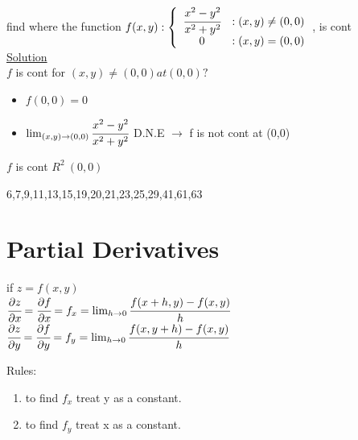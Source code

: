 \noindent{\color{smalt(darkpowderblue)}\rule{\linewidth}{.2mm}}
\begin{example}
find where the function 
$f(x,y) : \left\{ \begin{array}{cl}
\cfrac{x^{2} - y^{2}}{x^{2}+y^{2}} & :  (x,y) \neq (0,0) \\
0 & :  (x,y)=(0,0)\\
\end{array} \right.$, is cont\\ 
\underline{\textbf{\large}\color{smalt(darkpowderblue)}Solution}\\
$f$ is cont for $(x,y)\neq(0,0) at (0,0) ?$\\
\begin{itemize}
    \item $f(0,0) = 0$
    \item $\lim_{(x,y)\to(0,0)} \cfrac{x^{2}-y^{2}}{x^{2}+y^{2}}$ D.N.E $\rightarrow $ f is not cont at (0,0)
\end{itemize}
$f$ is cont $R^{2} \ {(0,0)}$
\end{example}
\noindent{\color{smalt(darkpowderblue)}\rule{\linewidth}{.2mm}}
\begin{problem}
6,7,9,11,13,15,19,20,21,23,25,29,41,61,63
\end{problem}
\section{Partial Derivatives}
\begin{definition}
if $z=f(x,y)$\\
$\cfrac{\partial z}{\partial x}=\cfrac{\partial f}{\partial x}= f_x = \lim_{h\to 0} \cfrac{f(x+h,y)-f(x,y)}{h}$\\
$\cfrac{\partial z}{\partial y}=\cfrac{\partial f}{\partial y}= f_y = \lim_{h\to 0} \cfrac{f(x,y+h)-f(x,y)}{h}$
\end{definition}

{\color{smalt(darkpowderblue)}Rules:}
\begin{enumerate}
\item to find $f_x$ treat y as a constant.
\item to find $f_y$ treat x as a constant.
\end{enumerate}
\noindent{\color{smalt(darkpowderblue)}\rule{\linewidth}{.2mm}}

